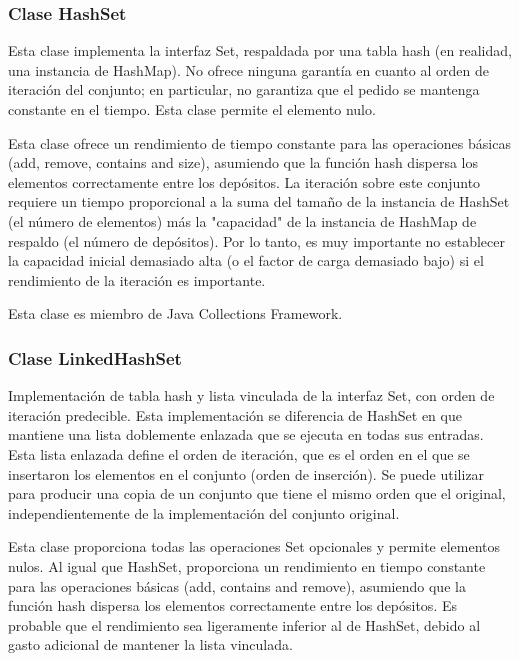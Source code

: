 \documentclass[11pt]{article}
\begin{document}
\subsubsection{Clase HashSet}
\par
Esta clase implementa la interfaz Set, respaldada por una tabla hash (en realidad, una instancia de HashMap). No ofrece ninguna garantía 
en cuanto al orden de iteración del conjunto; en particular, no 
garantiza que el pedido se mantenga constante en el tiempo. Esta 
clase permite el elemento nulo.
\par
Esta clase ofrece un rendimiento de tiempo constante para las 
operaciones básicas (add, remove, contains and size), asumiendo que 
la función hash dispersa los elementos correctamente entre los 
depósitos. La iteración sobre este conjunto requiere un tiempo 
proporcional a la suma del tamaño de la instancia de HashSet (el 
número de elementos) más la "capacidad" de la instancia de HashMap de 
respaldo (el número de depósitos). Por lo tanto, es muy importante no 
establecer la capacidad inicial demasiado alta (o el factor de carga 
demasiado bajo) si el rendimiento de la iteración es importante.

\par
Esta clase es miembro de Java Collections Framework.

\subsubsection{Clase LinkedHashSet}
\par
Implementación de tabla hash y lista vinculada de la interfaz Set, 
con orden de iteración predecible. Esta implementación se diferencia 
de HashSet en que mantiene una lista doblemente enlazada que se 
ejecuta en todas sus entradas. Esta lista enlazada define el orden de 
iteración, que es el orden en el que se insertaron los elementos en 
el conjunto (orden de inserción). Se puede utilizar para producir una 
copia de un conjunto que tiene el mismo orden que el original, 
independientemente de la implementación del conjunto original.
\par

Esta clase proporciona todas las operaciones Set opcionales y permite 
elementos nulos. Al igual que HashSet, proporciona un rendimiento en 
tiempo constante para las operaciones básicas (add, contains and 
remove), asumiendo que la función hash dispersa los elementos 
correctamente entre los depósitos. Es probable que el rendimiento sea 
ligeramente inferior al de HashSet, debido al gasto adicional de 
mantener la lista vinculada.
\end{document}
